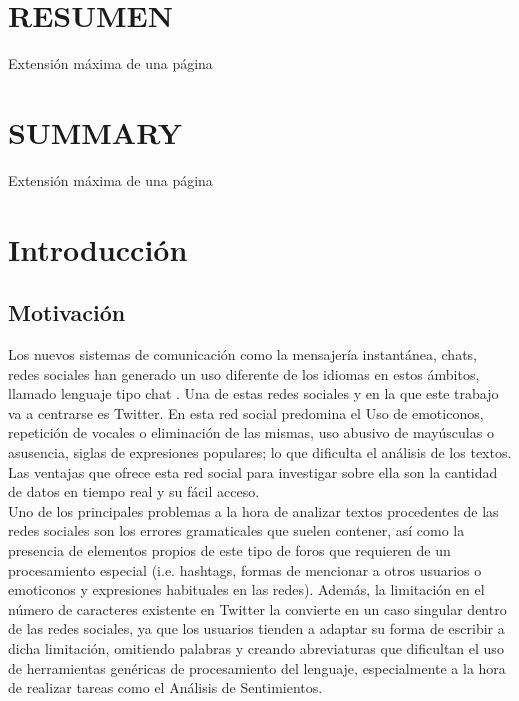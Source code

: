 \documentclass[spanish,12pt, a4paper,twoside]{paper}
\let\oldsection\section
\def\section{\cleardoublepage\oldsection}
\newcommand\blankpage{%
    \null
    \thispagestyle{empty}%
    \addtocounter{page}{-1}%
    \newpage}
\begin{document}
\afterpage{\blankpage}

\section*{RESUMEN}
Extensión máxima de una página


\section*{SUMMARY}
Extensión máxima de una página


\tableofcontents %



\listoffigures
\listoftables



\newpage
{} 

\section{Introducción}\label{sec:introduccion}
\subsection{Motivación}\label{sec:motivacion}
Los nuevos sistemas de comunicación como la mensajería instantánea, chats, redes sociales han generado un uso diferente de los idiomas en estos ámbitos, llamado lenguaje tipo chat \cite{forsyth:2007}. Una de estas redes sociales y en la que este trabajo va a centrarse es Twitter. En esta red social predomina el Uso de emoticonos, repetición de vocales o eliminación de las mismas, uso abusivo de mayúsculas o asusencia, siglas de expresiones populares; lo que dificulta el análisis de los textos. Las ventajas que ofrece esta red social para investigar sobre ella son la cantidad de datos en tiempo real y su fácil acceso.\\

Uno de los principales problemas a la hora de analizar textos procedentes de las redes sociales son los errores gramaticales que suelen contener, así como la presencia de elementos propios de este tipo de foros que requieren de un procesamiento especial (i.e. hashtags, formas de mencionar a otros usuarios o emoticonos y expresiones habituales en las redes). Además, la limitación en el número de caracteres existente en Twitter la convierte en un caso singular dentro de las redes sociales, ya que los usuarios tienden a adaptar su forma de escribir a dicha limitación, omitiendo palabras y creando abreviaturas que dificultan el uso de herramientas genéricas de procesamiento del lenguaje, especialmente a la hora de realizar tareas como el Análisis de Sentimientos.\\
\end{document}
